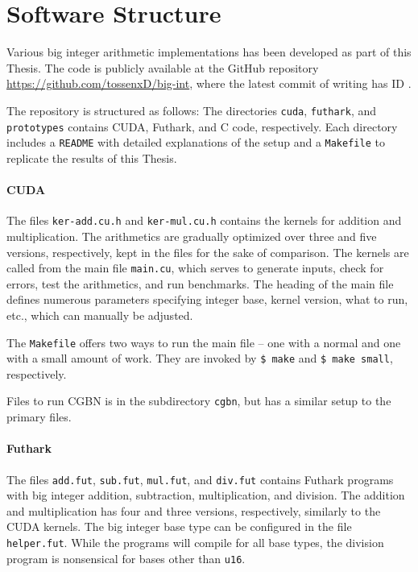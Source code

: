 \section{Software Structure}
\label{sec:cont}

Various big integer arithmetic implementations has been developed as part of
this Thesis. The code is publicly available at the GitHub repository
\url{https://github.com/tossenxD/big-int}, where the latest commit of writing
has ID {}.

The repository is structured as follows: The directories \texttt{cuda},
\texttt{futhark}, and \texttt{prototypes} contains CUDA, Futhark, and C code,
respectively. Each directory includes a \texttt{README} with detailed
explanations of the setup and a \texttt{Makefile} to replicate the results of
this Thesis.

\paragraph{CUDA}
The files \texttt{ker-add.cu.h} and \texttt{ker-mul.cu.h} contains the kernels
for addition and multiplication. The arithmetics are gradually optimized over
three and five versions, respectively, kept in the files for the sake of
comparison. The kernels are called from the main file \texttt{main.cu}, which
serves to generate inputs, check for errors, test the arithmetics, and run
benchmarks. The heading of the main file defines numerous parameters specifying
integer base, kernel version, what to run, etc., which can manually be adjusted.

The \texttt{Makefile} offers two ways to run the main file -- one with a normal
and one with a small amount of work. They are invoked by \texttt{\$ make} and
\texttt{\$ make small}, respectively.

Files to run CGBN is in the subdirectory \texttt{cgbn}, but has a similar setup
to the primary files.

\paragraph{Futhark}
The files \texttt{add.fut}, \texttt{sub.fut}, \texttt{mul.fut}, and
\texttt{div.fut} contains Futhark programs with big integer addition,
subtraction, multiplication, and division. The addition and multiplication has four
and three versions, respectively, similarly to the CUDA kernels. The big integer
base type can be configured in the file \texttt{helper.fut}. While the programs
will compile for all base types, the division program is nonsensical for bases
other than \texttt{u16}.

